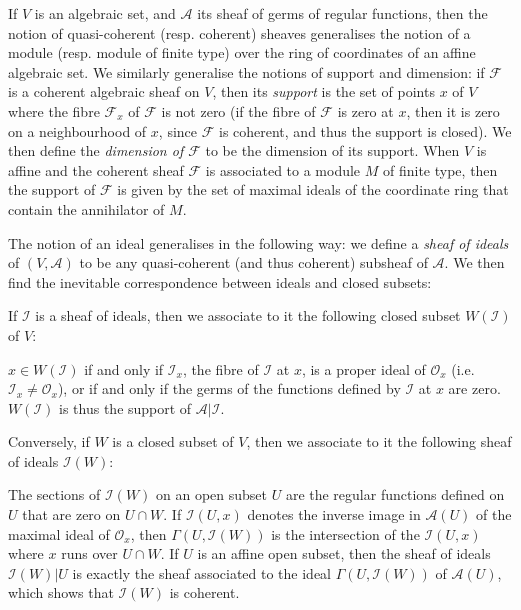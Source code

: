 \documentclass{article}
\newcommand{\scr}[1]{{\mathscr{#1}}}
\newcommand{\oldpage}[1]{\marginpar{\footnotesize$\Big\vert$ \textit{p.~#1}}}
\begin{document}
If $V$ is an algebraic set, and $\scr{A}$ its sheaf of germs of regular functions, then the notion of quasi-coherent (resp. coherent) sheaves generalises the notion of a module (resp. module of finite type) over the ring of coordinates of an affine algebraic set.
We similarly generalise the notions of support and dimension: if $\scr{F}$ is a coherent algebraic sheaf on $V$, then its \emph{support} is the set of points $x$ of $V$ where the fibre $\scr{F}_x$ of $\scr{F}$ is not zero (if the fibre of $\scr{F}$ is zero at $x$, then it is zero on a neighbourhood of $x$, since $\scr{F}$ is coherent, and thus the support is closed).
We then define the \emph{dimension of $\scr{F}$} to be the dimension of its support.
When $V$ is affine and the coherent sheaf $\scr{F}$ is associated to a module $M$ of finite type, then the support of $\scr{F}$ is given by the set of maximal ideals of the coordinate ring that contain the annihilator of $M$.

The notion of an ideal generalises in the following way: we define a \emph{sheaf of ideals} of $(V,\scr{A})$ to be any quasi-coherent (and thus coherent) subsheaf of $\scr{A}$.
We then find the inevitable correspondence between ideals and closed subsets:

If $\scr{I}$ is a sheaf of ideals, then we associate to it the following closed subset $W(\scr{I})$ of $V$:

$x\in W(\scr{I})$ if and only if $\scr{I}_x$, the fibre of $\scr{I}$ at $x$, is a proper ideal of $\scr{O}_x$ (i.e. $\scr{I}_x\neq\scr{O}_x$), or if and only if the germs of the functions defined by $\scr{I}$ at $x$ are zero.
$W(\scr{I})$ is thus the support of $\scr{A}|\scr{I}$.

Conversely, if $W$ is a closed subset of $V$, then we associate to it the following sheaf of ideals $\scr{I}(W)$:

The sections of $\scr{I}(W)$ on an open subset $U$ are the regular functions defined on $U$ that are zero on $U\cap W$.
If $\scr{I}(U,x)$ denotes the inverse image in $\scr{A}(U)$ of the maximal ideal of $\scr{O}_x$, then $\Gamma(U,\scr{I}(W))$ is the intersection
\oldpage{2-03}
of the $\scr{I}(U,x)$ where $x$ runs over $U\cap W$.
If $U$ is an affine open subset, then the sheaf of ideals $\scr{I}(W)|U$ is exactly the sheaf associated to the ideal $\Gamma(U,\scr{I}(W))$ of $\scr{A}(U)$, which shows that $\scr{I}(W)$ is coherent.
\end{document}
